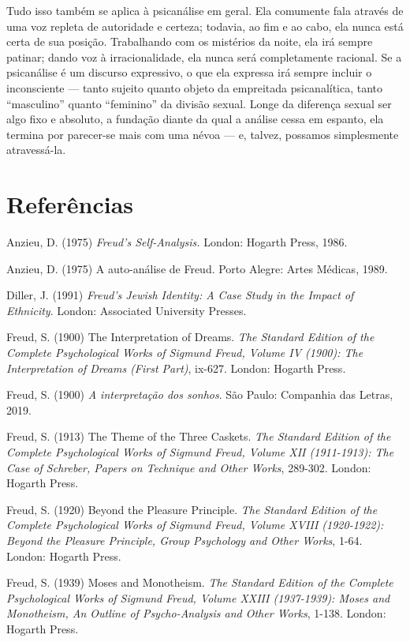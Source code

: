 Tudo isso também se aplica à psicanálise em geral. Ela comumente fala
através de uma voz repleta de autoridade e certeza; todavia, ao fim e ao
cabo, ela nunca está certa de sua posição. Trabalhando com os mistérios
da noite, ela irá sempre patinar; dando voz à irracionalidade, ela nunca
será completamente racional. Se a psicanálise é um discurso expressivo,
o que ela expressa irá sempre incluir o inconsciente --- tanto sujeito
quanto objeto da empreitada psicanalítica, tanto ``masculino'' quanto
``feminino'' da divisão sexual. Longe da diferença sexual ser algo fixo
e absoluto, a fundação diante da qual a análise cessa em espanto, ela
termina por parecer-se mais com uma névoa --- e, talvez, possamos
simplesmente atravessá-la.

\section{Referências}

Anzieu, D. (1975) \emph{Freud's Self-Analysis.} London: Hogarth Press,
1986.

Anzieu, D. (1975) A auto-análise de Freud. Porto Alegre: Artes Médicas,
1989.

Diller, J. (1991) \emph{Freud's Jewish Identity: A Case Study in the
Impact of Ethnicity}. London: Associated University Presses.

Freud, S. (1900) The Interpretation of Dreams. \emph{The Standard
Edition of the Complete Psychological Works of Sigmund Freud, Volume IV
(1900): The Interpretation of Dreams (First Part)}, ix-627. London:
Hogarth Press.

Freud, S. (1900) \emph{A interpretação dos sonhos}. São Paulo: Companhia
das Letras, 2019.

Freud, S. (1913) The Theme of the Three Caskets. \emph{The Standard
Edition of the Complete Psychological Works of Sigmund Freud, Volume XII
(1911-1913): The Case of Schreber, Papers on Technique and Other Works},
289-302. London: Hogarth Press.

Freud, S. (1920) Beyond the Pleasure Principle. \emph{The Standard
Edition of the Complete Psychological Works of Sigmund Freud, Volume
XVIII (1920-1922): Beyond the Pleasure Principle, Group Psychology and
Other Works}, 1-64. London: Hogarth Press.

Freud, S. (1939) Moses and Monotheism. \emph{The Standard Edition of the
Complete Psychological Works of Sigmund Freud, Volume XXIII (1937-1939):
Moses and Monotheism, An Outline of Psycho-Analysis and Other Works},
1-138. London: Hogarth Press.

